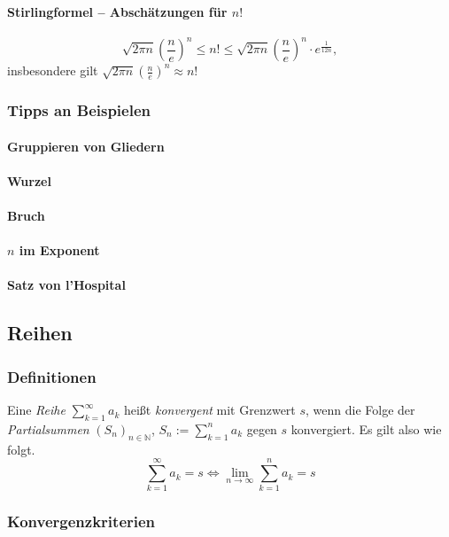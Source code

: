 \documentclass[a4paper, 9pt, DIV=24]{scrartcl}
\newcommand{\N}{\mathbb{N}}
\begin{document}
\paragraph{Stirlingformel -- Abschätzungen für $n!$}
\[\sqrt{2\pi n}(\frac{n}{e})^n \leq n! \leq \sqrt{2\pi n}(\frac{n}{e})^n \cdot e^{\frac{1}{12n}}, \] insbesondere gilt 
$\sqrt{2\pi n}(\frac{n}{e})^n \approx n!$

\subsubsection{Tipps an Beispielen}
\paragraph{Gruppieren von Gliedern}

\paragraph{Wurzel}

\paragraph{Bruch}

\paragraph{$n$ im Exponent}

\paragraph{Satz von l'Hospital}

\subsection{Reihen}
\subsubsection{Definitionen}
Eine \emph{Reihe} $\sum_{k = 1}^\infty a_k$ heißt \emph{konvergent} mit Grenzwert $s$, wenn die Folge der \emph{Partialsummen}
$(S_n)_{n \in \N}$, $S_n := \sum_{k=1}^n a_k$ gegen $s$ konvergiert. Es gilt also wie folgt.
\[ \sum_{k=1}^\infty a_k = s \iff \lim_{n\rightarrow\infty} \sum_{k=1}^n a_k = s \]

\subsubsection{Konvergenzkriterien}
\end{document}
